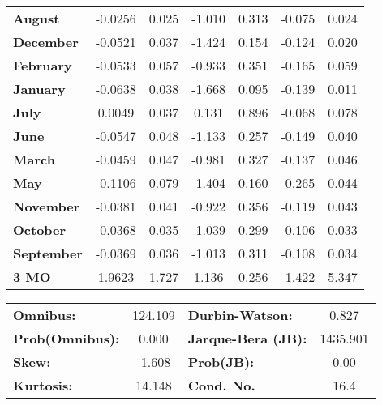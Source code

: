 \begin{center}
\begin{tabular}{lcccccc}
\textbf{August}    &      -0.0256  &        0.025     &    -1.010  &         0.313        &       -0.075    &        0.024     \\
\textbf{December}  &      -0.0521  &        0.037     &    -1.424  &         0.154        &       -0.124    &        0.020     \\
\textbf{February}  &      -0.0533  &        0.057     &    -0.933  &         0.351        &       -0.165    &        0.059     \\
\textbf{January}   &      -0.0638  &        0.038     &    -1.668  &         0.095        &       -0.139    &        0.011     \\
\textbf{July}      &       0.0049  &        0.037     &     0.131  &         0.896        &       -0.068    &        0.078     \\
\textbf{June}      &      -0.0547  &        0.048     &    -1.133  &         0.257        &       -0.149    &        0.040     \\
\textbf{March}     &      -0.0459  &        0.047     &    -0.981  &         0.327        &       -0.137    &        0.046     \\
\textbf{May}       &      -0.1106  &        0.079     &    -1.404  &         0.160        &       -0.265    &        0.044     \\
\textbf{November}  &      -0.0381  &        0.041     &    -0.922  &         0.356        &       -0.119    &        0.043     \\
\textbf{October}   &      -0.0368  &        0.035     &    -1.039  &         0.299        &       -0.106    &        0.033     \\
\textbf{September} &      -0.0369  &        0.036     &    -1.013  &         0.311        &       -0.108    &        0.034     \\
\textbf{3 MO}      &       1.9623  &        1.727     &     1.136  &         0.256        &       -1.422    &        5.347     \\
\bottomrule
\end{tabular}
\begin{tabular}{lclc}
\textbf{Omnibus:}       & 124.109 & \textbf{  Durbin-Watson:     } &    0.827  \\
\textbf{Prob(Omnibus):} &   0.000 & \textbf{  Jarque-Bera (JB):  } & 1435.901  \\
\textbf{Skew:}          &  -1.608 & \textbf{  Prob(JB):          } &     0.00  \\
\textbf{Kurtosis:}      &  14.148 & \textbf{  Cond. No.          } &     16.4  \\
\bottomrule
\end{tabular}
\end{center}

